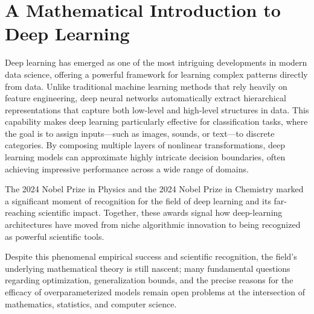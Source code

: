 \chapter{A Mathematical Introduction  to Deep Learning}
\label{c:deeplearning}


\newcommand{\bfa}{{\mathbf a}}
\newcommand{\bfb}{{\mathbf b}}
\newcommand{\bfh}{{\mathbf h}}

\newcommand{\bfu}{{\mathbf u}}
\newcommand{\bfv}{{\mathbf v}}
\newcommand{\bfw}{{\mathbf w}}
\newcommand{\bfW}{{\mathbf W}}
\newcommand{\bfx}{{\mathbf x}}
\newcommand{\bfy}{{\mathbf y}}
\newcommand{\bfz}{{\mathbf z}}



Deep learning has emerged as one of the most intriguing developments in modern data science, offering a powerful framework for learning complex patterns directly from data. Unlike traditional machine learning methods that rely heavily on feature engineering, deep neural networks automatically extract hierarchical representations that capture both low-level and high-level structures in data. This capability makes deep learning particularly effective for classification tasks, where the goal is to assign inputs---such as images, sounds, or text---to discrete categories. By composing multiple layers of nonlinear transformations, deep learning models can approximate highly intricate decision boundaries, often achieving impressive performance across a wide range of domains.

The 2024 Nobel Prize in Physics and the 2024 Nobel Prize in Chemistry marked a significant moment of recognition for the field of deep learning and its far-reaching scientific impact. Together, these awards signal how deep-learning architectures have moved from niche algorithmic innovation to being recognized as powerful scientific tools.



Despite this phenomenal empirical success and scientific recognition, the field's underlying mathematical theory is still nascent; many fundamental questions regarding optimization, generalization bounds, and the precise reasons for the efficacy of overparameterized models remain open problems at the intersection of mathematics, statistics, and computer science.




